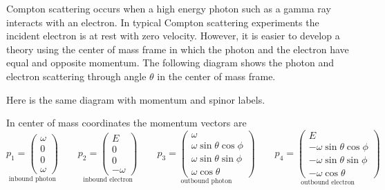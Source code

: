 \documentclass[12pt]{article}
\begin{document}
\noindent
Compton scattering occurs when a high energy photon such as a gamma ray interacts with an electron.
In typical Compton scattering experiments the incident electron is at rest with zero velocity.
However, it is easier to develop a theory using the center of mass frame in which
the photon and the electron have equal and opposite momentum.
The following diagram shows the photon and electron scattering through angle $\theta$
in the center of mass frame.
\begin{center}
\end{center}

\noindent
Here is the same diagram with momentum and spinor labels.
\begin{center}
\end{center}

\noindent
In center of mass coordinates the momentum vectors are
\begin{equation*}
\underset{\text{inbound photon}}
{
p_1=\begin{pmatrix}\omega\\0\\0\\ \omega\end{pmatrix}
}
\qquad
\underset{\text{inbound electron}}
{
p_2=\begin{pmatrix}E\\0\\0\\-\omega\end{pmatrix}
}
\qquad
\underset{\text{outbound photon}}
{
p_3=\begin{pmatrix}
\omega\\
\omega\sin\theta\cos\phi\\
\omega\sin\theta\sin\phi\\
\omega\cos\theta
\end{pmatrix}
}
\qquad
\underset{\text{outbound electron}}
{
p_4=\begin{pmatrix}
E\\
-\omega\sin\theta\cos\phi\\
-\omega\sin\theta\sin\phi\\
-\omega\cos\theta
\end{pmatrix}
}
\end{equation*}
\end{document}
